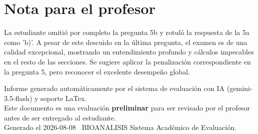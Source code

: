 \documentclass[11pt,a4paper]{article}
\begin{document}
\section*{Nota para el profesor}
\begin{tcolorbox}[
  enhanced, breakable,
  colback=yellow!8, colframe=yellow!60!black,
  fonttitle=\bfseries, coltitle=black,
  title={Observaciones para revisión manual},
  top=4pt, bottom=4pt, left=8pt, right=8pt,
]
La estudiante omitió por completo la pregunta 5b y rotuló la respuesta de la 5a como 'b)'. A pesar de este descuido en la última pregunta, el examen es de una calidad excepcional, mostrando un entendimiento profundo y cálculos impecables en el resto de las secciones. Se sugiere aplicar la penalización correspondiente en la pregunta 5, pero reconocer el excelente desempeño global.
\end{tcolorbox}

\vspace{12pt}
\begin{center}
  \footnotesize\color{gray}
  Informe generado automáticamente por el sistema de evaluación con IA (gemini-3.5-flash) y soporte LaTex. \\
  Este documento es una evaluación \textbf{preliminar} para ser revisado por el profesor antes de ser entregado al 
  estudiante. \\
  Generado el 2026-08-08 \textbullet\ BIOANALISIS Sistema Académico de Evaluación.
  \end{center}
\end{document}
